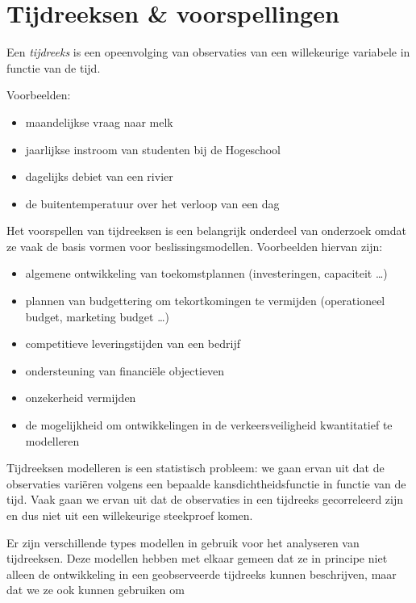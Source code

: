 \section{Tijdreeksen \& voorspellingen}

\begin{definition}[Tijdreeks]
Een \emph{tijdreeks} is een opeenvolging van observaties van een willekeurige variabele in functie van de tijd.
\end{definition}

Voorbeelden:

\begin{itemize}
	\item maandelijkse vraag naar melk
	\item jaarlijkse instroom van studenten bij de Hogeschool
	\item dagelijks debiet van een rivier
	\item de buitentemperatuur over het verloop van een dag
\end{itemize}

Het voorspellen van tijdreeksen is een belangrijk onderdeel van onderzoek omdat ze vaak de basis vormen voor beslissingsmodellen. Voorbeelden hiervan zijn:

\begin{itemize}
	\item algemene ontwikkeling van toekomstplannen (investeringen, capaciteit \dots)
	\item plannen van budgettering om tekortkomingen te vermijden (operationeel budget, marketing budget \dots)
	\item competitieve leveringstijden van een bedrijf
	\item ondersteuning van financiële objectieven
	\item onzekerheid vermijden
	\item de mogelijkheid om ontwikkelingen in de verkeersveiligheid
kwantitatief te modelleren
\end{itemize}

Tijdreeksen modelleren is een statistisch probleem: we gaan ervan uit dat de observaties variëren volgens een bepaalde kansdichtheidsfunctie in functie van de tijd. Vaak gaan we ervan uit dat de observaties in een tijdreeks gecorreleerd zijn en dus niet uit een willekeurige steekproef komen. 

Er zijn verschillende types modellen in gebruik voor het analyseren van tijdreeksen. Deze modellen hebben met elkaar gemeen dat ze in principe niet alleen de ontwikkeling in een geobserveerde tijdreeks kunnen beschrijven, maar dat we ze ook kunnen gebruiken om

